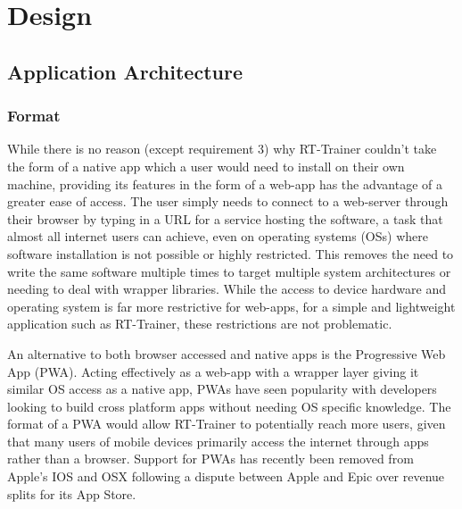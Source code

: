 \chapter{Design}
\label{ch:design}

\section{Application Architecture}

\subsection{Format}
While there is no reason (except requirement 3) why RT-Trainer couldn't take the form of a native app which a user would need to install on their own machine, providing its features in the form of a web-app has the advantage of a greater ease of access. The user simply needs to connect to a web-server through their browser by typing in a URL for a service hosting the software, a task that almost all internet users can achieve, even on operating systems (OSs) where software installation is not possible or highly restricted. This removes the need to write the same software multiple times to target multiple system architectures or needing to deal with wrapper libraries. While the access to device hardware and operating system is far more restrictive for web-apps, for a simple and lightweight application such as RT-Trainer, these restrictions are not problematic. 

An alternative to both browser accessed and native apps is the Progressive Web App (PWA). Acting effectively as a web-app with a wrapper layer giving it similar OS access as a native app, PWAs have seen popularity with developers looking to build cross platform apps without needing OS specific knowledge. The format of a PWA would allow RT-Trainer to potentially reach more users, given that many users of mobile devices primarily access the internet through apps rather than a browser. Support for PWAs has recently been removed from Apple's IOS and OSX following a dispute between Apple and Epic over revenue splits for its App Store. 

